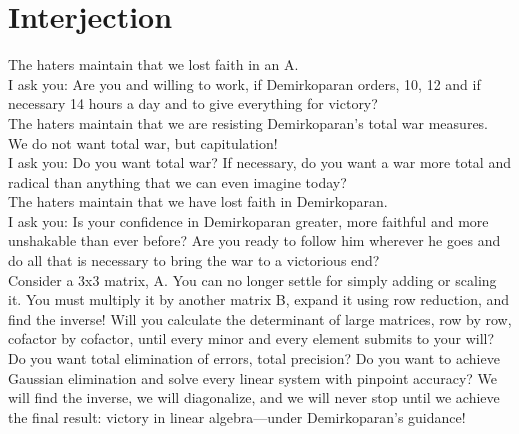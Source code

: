 \documentclass{report}
\begin{document}
\section{Interjection}
\setcounter{theorem}{0}
\begin{theorem}
\end{theorem}
The haters maintain that we lost faith in an A.\\
I ask you: Are you and willing to work, if Demirkoparan orders, 10, 12 and if necessary 14 hours a day and to give everything for victory? \\
The haters maintain that we are resisting Demirkoparan's total war measures. We do not want total war, but capitulation!\\
I ask you: Do you want total war? If necessary, do you want a war more total and radical than anything that we can even imagine today?\\
The haters maintain that we have lost faith in Demirkoparan.\\
I ask you: Is your confidence in Demirkoparan greater, more faithful and more unshakable than ever before? Are you ready to follow him wherever he goes and do all that is necessary to bring the war to a victorious end?\\
Consider a 3x3 matrix, A. You can no longer settle for simply adding or scaling it. You must multiply it by another matrix B, expand it using row reduction, and find the inverse! Will you calculate the determinant of large matrices, row by row, cofactor by cofactor, until every minor and every element submits to your will?\\
Do you want total elimination of errors, total precision? Do you want to achieve Gaussian elimination and solve every linear system with pinpoint accuracy? We will find the inverse, we will diagonalize, and we will never stop until we achieve the final result: victory in linear algebra—under Demirkoparan’s guidance!\\
\end{document}
